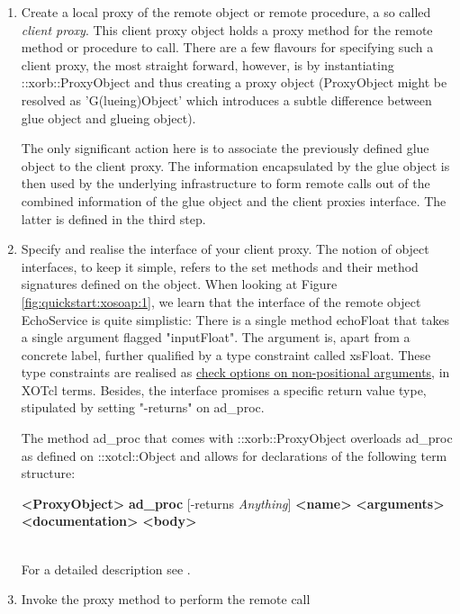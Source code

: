 \begin{enumerate}
\item Create a local proxy of the remote object or remote procedure, a so called \emph{client proxy}. This client proxy object holds a proxy method for the remote method or procedure to call. There are a few flavours for specifying such a client proxy, the most straight forward, however, is by instantiating ::xorb::ProxyObject and thus creating a proxy object (ProxyObject might be resolved as 'G(lueing)Object' which introduces a subtle difference between glue object and glueing object).

The only significant action here is to associate the previously defined glue object to the client proxy. The information encapsulated by the glue object is then used by the underlying infrastructure to form remote calls out of the combined information of the glue object and the client proxies interface. The latter is defined in the third step.
\item Specify and realise the interface of your client proxy. The notion of object interfaces, to keep it simple, refers to the set methods and their method signatures defined on the object. When looking at Figure \ref{fig:quickstart:xosoap:1}, we learn that the interface of the remote object EchoService is quite simplistic: There is a single method echoFloat that takes a single argument flagged "inputFloat". The argument is, apart from a concrete label, further qualified by a type constraint called xsFloat. These type constraints are realised as \href{http://media.wu-wien.ac.at/doc/tutorial.html#non-pos-args}{check options on non-positional arguments}, in XOTcl terms. Besides, the interface promises a specific return value type, stipulated by setting "-returns" on ad\_proc.

The method ad\_proc that comes with ::xorb::ProxyObject overloads ad\_proc as defined on ::xotcl::Object and allows for declarations of the following term structure: \\\begin{footnotesize}\textbf{<ProxyObject>} \textbf{ad\_proc} [-returns \textit{Anything}] \textbf{<name>} \textbf{<arguments>} \textbf{<documentation>} \textbf{<body>}\end{footnotesize}\\
For a detailed description see .
\item Invoke the proxy method to perform the remote call

\end{enumerate}
